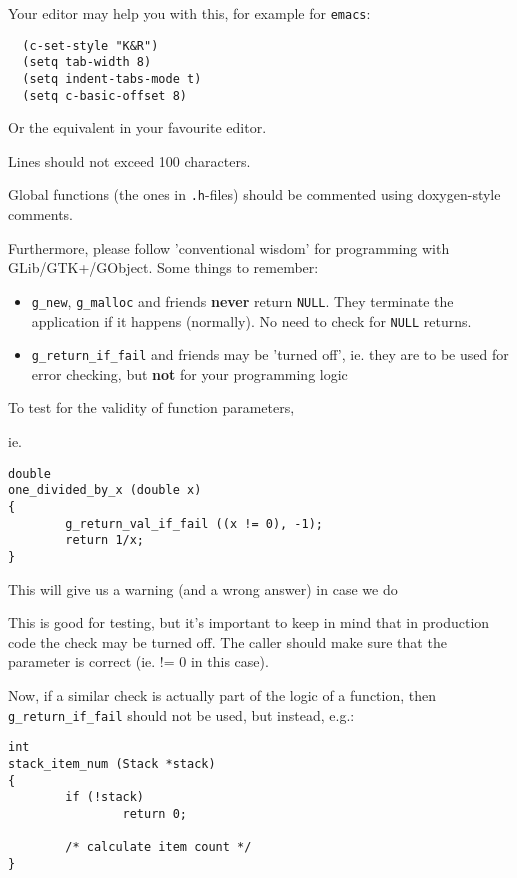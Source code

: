 \documentclass{book}
\begin{document}
Your editor may help you with this, for example for {\tt emacs}:
\begin{verbatim}
  (c-set-style "K&R")
  (setq tab-width 8)
  (setq indent-tabs-mode t)
  (setq c-basic-offset 8)
\end{verbatim}

Or the equivalent in your favourite editor.

Lines should not exceed 100 characters.

Global functions (the ones in {\tt .h}-files) should be commented using 
doxygen-style comments.

Furthermore, please follow 'conventional wisdom' for programming with 
GLib/GTK+/GObject. Some things to remember:
\begin{itemize}
\item {\tt g\_new}, {\tt g\_malloc} and friends {\bf never} return {\tt NULL}. They terminate
  the application if it happens (normally). No need to check for {\tt NULL} returns.
\item {\tt g\_return\_if\_fail} and friends may be 'turned off', ie. they are
  to be used for error checking, but {\bf not} for your programming logic
\end{itemize}

To test for the validity of function parameters,

ie.
\begin{verbatim}
double
one_divided_by_x (double x)
{
        g_return_val_if_fail ((x != 0), -1);
        return 1/x;     
}
\end{verbatim}
This will give us a warning (and a wrong answer) in case we do

This is good for testing, but it's important to keep in mind that in
production code the check may be turned off. The caller should make
sure that the parameter is correct (ie. != 0 in this case).

Now, if a similar check is actually part of the logic of a function,
then {\tt g\_return\_if\_fail} should not be used, but instead, e.g.:
\begin{verbatim}
int
stack_item_num (Stack *stack)
{
        if (!stack)
                return 0;

        /* calculate item count */
}
\end{verbatim}
\end{document}

